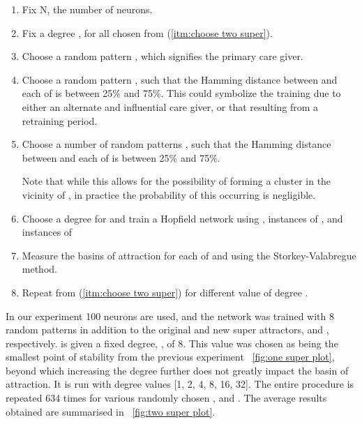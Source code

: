 \begin{enumerate}

\item Fix N, the number of neurons.

\item Fix a degree \dorigin, for all chosen \poriginsuper from (\ref{itm:choose two super}).

\item \label{itm:choose two super} Choose a random pattern \poriginsuper, which signifies the primary care giver.

\item Choose a random pattern \pnewsuper, such that the Hamming distance between \poriginsuper and each of \pnewsuper is between 25\% and 75\%. This could symbolize the training due to either an alternate and influential care giver, or that resulting from a retraining period. 


\item Choose a number of random patterns \prandom, such that the Hamming distance between \poriginsuper and each of \prandom is between 25\% and 75\%.

Note that while this allows for the possibility of forming a cluster in the vicinity of \pnewsuper, in practice the probability of this occurring is negligible.


\item Choose a degree \dnew for \pnewsuper and train a Hopfield network using \prandom, \dorigin instances of \poriginsuper, and \dnew instances of \pnewsuper

\item Measure the basins of attraction for each of \poriginsuper and \pnewsuper using the Storkey-Valabregue method. 

\item Repeat from (\ref{itm:choose two super}) for different value of degree \dnew.

\end{enumerate}

In our experiment 100 neurons are used, and the network was trained with 8 random patterns in addition to the original and new super attractors, \poriginsuper and \pnewsuper, respectively. \poriginsuper is given a fixed degree, \dorigin, of 8. This value was chosen as being the smallest point of stability from the previous experiment ~\ref{fig:one super plot}, beyond which increasing the degree further does not greatly impact the basin of attraction. It is run with \dnew degree values {[}1, 2, 4, 8, 16, 32{]}. The entire procedure is repeated 634  times for various randomly chosen \poriginsuper, \pnewsuper and \prandom. The average results obtained are summarised in ~\ref{fig:two super plot}.

